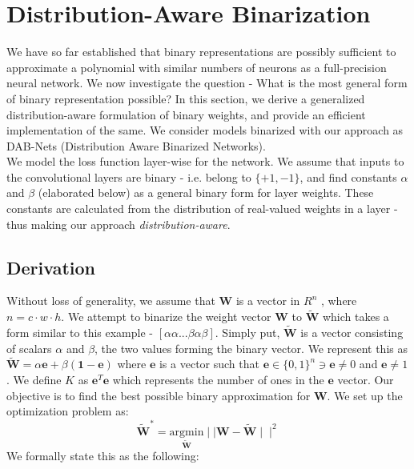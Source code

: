 \section{Distribution-Aware Binarization}

\noindent We have so far established that binary representations are possibly sufficient to approximate a polynomial with similar numbers of neurons as a full-precision neural network. We now investigate the question - What is the most general form of binary representation possible? In this section, we derive a generalized distribution-aware formulation of binary weights, and provide an efficient implementation of the same. We consider models binarized with our approach as DAB-Nets (Distribution Aware Binarized Networks).\\

\noindent We model the loss function layer-wise for the network. We assume that inputs to the convolutional layers are binary - i.e. belong to $\{+1, -1\}$, and find constants $\alpha$ and $\beta$ (elaborated below) as a general binary form for layer weights. These constants are calculated from the distribution of real-valued weights in a layer - thus making our approach \textit{distribution-aware}. 

\subsection{Derivation}
\noindent Without loss of generality, we assume that $\mathbf{W}$ is a vector in $R^{n}$ , where $n = c\cdot w\cdot h$.
We attempt to binarize the weight vector $\mathbf{W}$ to $\widetilde{\mathbf{W}}$ which takes a form similar to this example - $[\alpha \alpha... \beta \alpha \beta]$. Simply put, $\widetilde{\mathbf{W}}$ is a vector consisting of scalars $\alpha$ and $\beta$, the two values forming the binary vector. We represent this as $\widetilde{\mathbf{W}} = \alpha \mathbf{e} + \beta \mathbf{(1-e)}$ where $\mathbf{e}$ is a vector such that $\mathbf{e} \in \{0,1\}^n \ni \mathbf{e} \neq 0$ and $\mathbf{e} \neq 1$.  We define $K$ as $\mathbf{e}^T\mathbf{e}$ which represents the number of ones in the $\mathbf{e}$ vector. Our objective is to find the best possible binary approximation for $\mathbf{W}$. We set up the optimization problem as: $$\widetilde{\mathbf{W}}^\ast = \underset{\widetilde{\mathbf{W}}}{\mathrm{argmin}}\mid\mid \mathbf{W}-\widetilde{\mathbf{W}}\mid\mid^{2}$$ We formally state this as the following: \\


